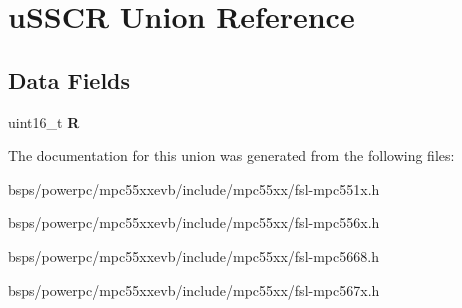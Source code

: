 \hypertarget{unionuSSCR}{}\section{u\+S\+S\+CR Union Reference}
\label{unionuSSCR}
\subsection*{Data Fields}
\begin{DoxyCompactItemize}
\item 
\mbox{\label{unionuSSCR_a4f5e4b7228d00d14ef502b0630eaf15c}} 
uint16\+\_\+t {\bfseries R}
\end{DoxyCompactItemize}


The documentation for this union was generated from the following files\+:\begin{DoxyCompactItemize}
\item 
bsps/powerpc/mpc55xxevb/include/mpc55xx/fsl-\/mpc551x.\+h\item 
bsps/powerpc/mpc55xxevb/include/mpc55xx/fsl-\/mpc556x.\+h\item 
bsps/powerpc/mpc55xxevb/include/mpc55xx/fsl-\/mpc5668.\+h\item 
bsps/powerpc/mpc55xxevb/include/mpc55xx/fsl-\/mpc567x.\+h\end{DoxyCompactItemize}
